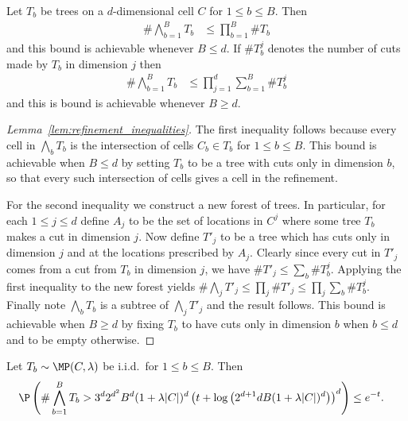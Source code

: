 \documentclass{article}
\begin{document}
\begin{lemma}
  \label{lem:refinement_inequalities}

  Let $T_b$ be trees on a $d$-dimensional cell $C$
  for $1 \leq b \leq B$.
  Then
  \begin{align*}
    \# \bigwedge_{b=1}^B T_b
    &\leq \prod_{b=1}^B \# T_b
  \end{align*}
  and this bound is achievable whenever $B \leq d$.
  If $\# T_b^j$ denotes the number of cuts
  made by $T_b$ in dimension $j$ then
  \begin{align*}
    \# \bigwedge_{b=1}^B T_b
    &\leq \prod_{j=1}^d
      \sum_{b=1}^B \# T_b^j
  \end{align*}
  and this is bound is achievable whenever $B \geq d$.

\end{lemma}

\begin{proof}[Lemma~\ref{lem:refinement_inequalities}]

  The first inequality follows because every cell in
  $\bigwedge_b T_b$ is the intersection of cells
  $C_b \in T_b$ for $1 \leq b \leq B$.
  This bound is achievable when $B \leq d$ by setting
  $T_b$ to be a tree with cuts only in dimension $b$,
  so that every such intersection of cells
  gives a cell in the refinement.

  For the second inequality we construct a new forest of trees.
  In particular, for each $1 \leq j \leq d$ define
  $A_j$ to be the set of locations in $C^j$ where some tree $T_b$
  makes a cut in dimension $j$.
  Now define $T'_j$ to be a tree which has cuts
  only in dimension $j$ and at the locations prescribed by $A_j$.
  Clearly since every cut in $T'_j$
  comes from a cut from $T_b$ in dimension $j$,
  we have $\# T'_j \leq \sum_b \# T_b^j$.
  Applying the first inequality to the new forest yields
  $\# \bigwedge_j T'_j \leq \prod_j \# T'_j
  \leq \prod_j \sum_b \# T_b^j$.
  Finally note $\bigwedge_b T_b$
  is a subtree of $\bigwedge_j T'_j$ and the result follows.
  This bound is achievable when $B \geq d$ by fixing
  $T_b$ to have cuts only in dimension $b$ when $b \leq d$
  and to be empty otherwise.
\end{proof}




\begin{lemma}
  \label{lem:refinement_tail}

  Let $T_b \sim \MP(C, \lambda)$ be i.i.d.\ for $1 \leq b \leq B$.
  Then
  \begin{align*}
    \P\left(
    \# \bigwedge_{b=1}^B T_b
    > 3^d 2^{d^2} B^d (1+\lambda|C|)^d
    \left(
    t + \log\left( 2^{d+1} dB (1 + \lambda |C|)^d \right)
    \right)^d
    \right)
    &\leq e^{-t}.
  \end{align*}


\end{lemma}
\end{document}
